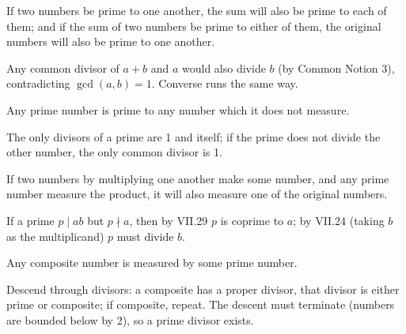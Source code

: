 \documentclass{rrxiv}
\begin{document}
\begin{claim}
\label{prop:VII.28}
If two numbers be prime to one another, the sum will also be prime
to each of them; and if the sum of two numbers be prime to either of
them, the original numbers will also be prime to one another.
\end{claim}
\begin{evidence}
\label{ev:VII.28}
Any common divisor of $a + b$ and $a$ would also divide $b$ (by
Common Notion 3), contradicting $\gcd(a, b) = 1$.  Converse runs the
same way.
\end{evidence}

\begin{claim}
\label{prop:VII.29}
Any prime number is prime to any number which it does not measure.
\end{claim}
\begin{evidence}
\label{ev:VII.29}
The only divisors of a prime are 1 and itself; if the prime does not
divide the other number, the only common divisor is 1.
\end{evidence}

\begin{claim}
\label{prop:VII.30}
If two numbers by multiplying one another make some number, and any
prime number measure the product, it will also measure one of the
original numbers.
\end{claim}
\begin{evidence}
\label{ev:VII.30}
If a prime $p \mid ab$ but $p \nmid a$, then by VII.29 $p$ is
coprime to $a$; by VII.24 (taking $b$ as the multiplicand) $p$ must
divide $b$.
\end{evidence}

\begin{claim}
\label{prop:VII.31}
Any composite number is measured by some prime number.
\end{claim}
\begin{evidence}
\label{ev:VII.31}
Descend through divisors: a composite has a proper divisor, that
divisor is either prime or composite; if composite, repeat.  The
descent must terminate (numbers are bounded below by 2), so a prime
divisor exists.
\end{evidence}
\end{document}
